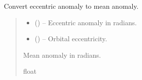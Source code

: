\documentclass[letterpaper,10pt,english]{sphinxmanual}
\begin{document}
\begin{fulllineitems}
\label{\detokenize{fspsim.utils:fspsim.utils.Conversions.eccentric_to_mean_anomaly}}
\pysigstartsignatures
{}
\pysigstopsignatures
\sphinxAtStartPar
Convert eccentric anomaly to mean anomaly.
\begin{quote}\begin{description}
\begin{itemize}
\item {} 
\sphinxAtStartPar
{} () – Eccentric anomaly in radians.

\item {} 
\sphinxAtStartPar
{} () – Orbital eccentricity.

\end{itemize}

\sphinxAtStartPar
Mean anomaly in radians.

\sphinxAtStartPar
float

\end{description}\end{quote}

\end{fulllineitems}

\end{document}
